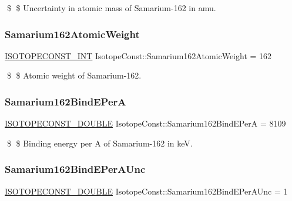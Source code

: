 \$ \$ Uncertainty in atomic mass of Samarium-\/162 in amu. \mbox{\label{group___isotope_const-_samarium-_sm162_ga34923d1979243a74fd652f9600edee42}} 
\subsubsection{\texorpdfstring{Samarium162\+Atomic\+Weight}{Samarium162AtomicWeight}}
{\footnotesize\ttfamily \mbox{\hyperlink{group___isotope_const-_macros_ga5f18360b3e99483a35c32d789e62621c}{I\+S\+O\+T\+O\+P\+E\+C\+O\+N\+S\+T\+\_\+\+I\+NT}} Isotope\+Const\+::\+Samarium162\+Atomic\+Weight = 162}

\$ \$ Atomic weight of Samarium-\/162. \mbox{\label{group___isotope_const-_samarium-_sm162_gac2b5532bd71b3596fb56d0aa07f8e49c}} 
\subsubsection{\texorpdfstring{Samarium162\+Bind\+E\+PerA}{Samarium162BindEPerA}}
{\footnotesize\ttfamily \mbox{\hyperlink{group___isotope_const-_macros_ga8f45a7272ce02c0b4c65c44636ed719a}{I\+S\+O\+T\+O\+P\+E\+C\+O\+N\+S\+T\+\_\+\+D\+O\+U\+B\+LE}} Isotope\+Const\+::\+Samarium162\+Bind\+E\+PerA = 8109}

\$ \$ Binding energy per A of Samarium-\/162 in keV. \mbox{\label{group___isotope_const-_samarium-_sm162_gaacd5cda993d94b31db1954a3fdcc0304}} 
\subsubsection{\texorpdfstring{Samarium162\+Bind\+E\+Per\+A\+Unc}{Samarium162BindEPerAUnc}}
{\footnotesize\ttfamily \mbox{\hyperlink{group___isotope_const-_macros_ga8f45a7272ce02c0b4c65c44636ed719a}{I\+S\+O\+T\+O\+P\+E\+C\+O\+N\+S\+T\+\_\+\+D\+O\+U\+B\+LE}} Isotope\+Const\+::\+Samarium162\+Bind\+E\+Per\+A\+Unc = 1}

